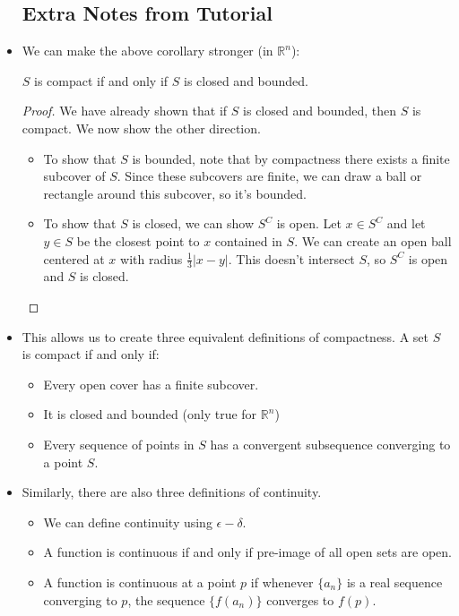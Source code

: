 \begin{itemize}
          \subsection{Extra Notes from Tutorial}
    \item We can make the above corollary stronger (in $\mathbb{R}^n$):
          \begin{theorem}
              $S$ is compact if and only if $S$ is closed and bounded.
          \end{theorem}
          \begin{proof}
              We have already shown that if $S$ is closed and bounded, then $S$ is compact. We now show the other direction.
              \begin{itemize}
                  \item To show that $S$ is bounded, note that by compactness there exists a finite subcover of $S$. Since these subcovers are finite, we can draw a ball or rectangle around this subcover, so it's bounded.
                  \item To show that $S$ is closed, we can show $S^C$ is open. Let $x\in S^C$ and let $y\in S$ be the closest point to $x$ contained in $S$. We can create an open ball centered at $x$ with radius $\frac{1}{3}|x-y|.$ This doesn't intersect $S$, so $S^C$ is open and $S$ is closed.
              \end{itemize}
          \end{proof}
    \item This allows us to create three equivalent definitions of compactness. A set $S$ is compact if and only if:
          \begin{itemize}
              \item Every open cover has a finite subcover.
              \item It is closed and bounded (only true for $\mathbb{R}^n$)
              \item Every sequence of points in $S$ has a convergent subsequence converging to a point $S$.
          \end{itemize}
    \item Similarly, there are also three definitions of continuity.
          \begin{itemize}
              \item We can define continuity using $\epsilon-\delta.$
              \item A function is continuous if and only if pre-image of all open sets are open.
              \item A function is continuous at a point $p$ if whenever $\{a_n\}$ is a real sequence converging to $p$, the sequence $\{f(a_n)\}$ converges to $f(p).$

\end{itemize}
\end{itemize}
